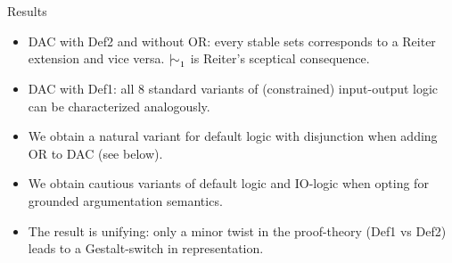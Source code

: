\documentclass[aspectratio=169]{beamer}
\begin{document}
\begin{frame}[label={sec:org09f854e}]{Results}
\begin{itemize}
\item DAC with Def2 and without OR: every stable sets corresponds to a \alert{Reiter} extension and vice versa. \(\mathop{\mid\!\sim}_1\) is Reiter's sceptical consequence. \pause
\item DAC with Def1: all 8 standard variants of (constrained) \alert{input-output logic} can be characterized analogously. \pause
\item We obtain a natural variant for \alert{default logic} with disjunction when adding OR to DAC (see below). \pause
\item We obtain \alert{cautious variants} of default logic and IO-logic when opting for grounded argumentation semantics. \pause
\item The result is \alert{unifying}: only a minor twist in the proof-theory (Def1 vs Def2) leads to a Gestalt-switch in representation.
\end{itemize}
\end{frame}
\end{document}

